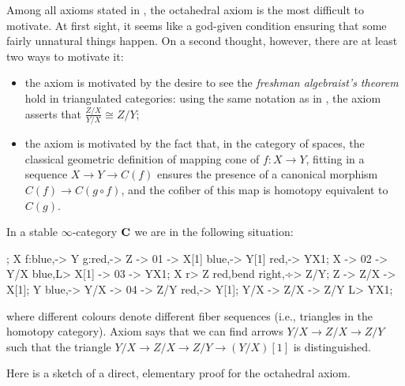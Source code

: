 \begin{example}
Among all axioms stated in \adef {}, the octahedral axiom  is the most difficult to motivate. At first sight, it seems like a god\hyp{}given condition ensuring that some fairly unnatural things happen. On a second thought, however, there are at least two ways to motivate it:
\begin{itemize}
\item the axiom is motivated by the desire to see the \emph{freshman algebraist's theorem} hold in triangulated categories: using the same notation as in , the axiom asserts that $\frac{Z/X}{Y/X}\cong Z/Y$;
\item the axiom is motivated by the fact that, in the category of spaces, the classical geometric definition of mapping cone of $f\colon X\to Y$, fitting in a sequence $X\to Y\to C(f)$ ensures the presence of a canonical morphism $C(f)\to C(g\circ f)$, and the cofiber of this map is homotopy equivalent to $C(g)$.
\end{itemize}
In a stable $\infty$\hyp{}category $\textbf{C}$ we are in the following situation:
\begin{center}
\begin{kD}
;
\mor X f:blue,-> Y g:red,-> Z -> 01 -> X[1] blue,-> Y[1] red,-> YX1;
\mor X -> 02 -> Y/X blue,L> X[1] -> 03 -> YX1;
\mor X r> Z red,{bend right},÷> Z/Y; \mor Z -> Z/X -> X[1];
\mor Y blue,-> Y/X -> 04 -> Z/Y red,-> Y[1];
\mor[dashed] Y/X -> Z/X -> Z/Y L> YX1;
\end{kD}
\end{center}
where different colours denote different fiber sequences (i.e., triangles in the homotopy category). Axiom  says that we can find arrows $Y/X\to Z/X\to Z/Y$  such that the triangle $Y/X\to Z/X\to Z/Y\to (Y/X)[1]$ is distinguished. 

Here is a sketch of a direct, elementary proof for the octahedral axiom.


\end{example}
